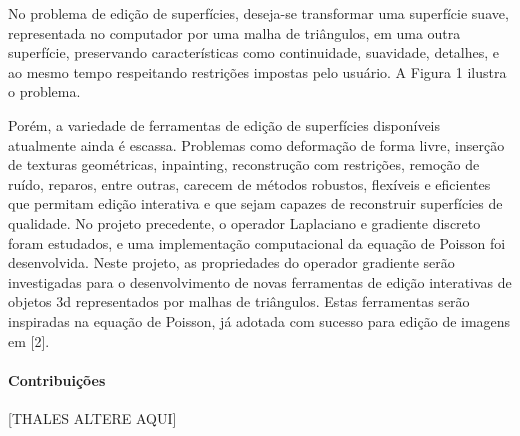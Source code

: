 No problema de edição de superfícies, deseja-se transformar uma superfície suave, representada no 
computador por uma malha de triângulos, em uma outra superfície, preservando características como 
continuidade, suavidade, detalhes, e ao mesmo tempo respeitando restrições impostas pelo usuário. A 
Figura 1 ilustra o problema.

Porém, a variedade de ferramentas de edição de superfícies disponíveis atualmente ainda é escassa. 
Problemas como deformação de forma livre, inserção de texturas geométricas, inpainting, reconstrução 
com restrições, remoção de ruído, reparos, entre outras, carecem de métodos robustos, flexíveis e 
eficientes que permitam edição interativa e que sejam capazes de reconstruir superfícies de qualidade. 
No projeto precedente, o operador Laplaciano e gradiente discreto foram estudados, e uma 
implementação computacional da equação de Poisson foi desenvolvida. Neste projeto, as propriedades do 
operador gradiente serão investigadas para o desenvolvimento de novas ferramentas de edição interativas 
de objetos 3d representados por malhas de triângulos. Estas ferramentas serão inspiradas na equação de 
Poisson, já adotada com sucesso para edição de imagens em [2].


\paragraph*{Contribuições}
%
[THALES ALTERE AQUI]


%
%

